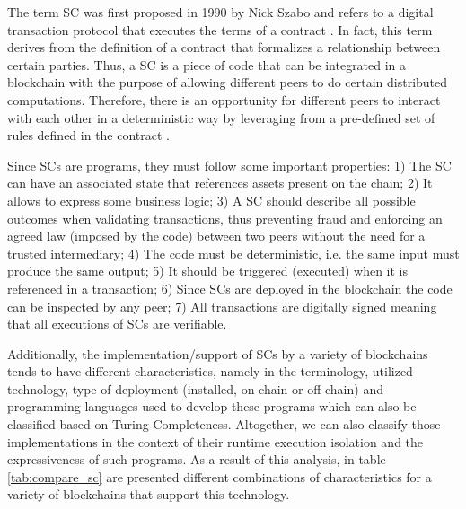 % 

The term \gls{SC} was first proposed in 1990 by Nick Szabo and refers to a digital transaction protocol that executes the terms of a contract \cite{smart_contract_nick_szabo}. In fact, this term derives from the definition of a contract that formalizes a relationship between certain parties. Thus, a \gls{SC} is a piece of code that can be integrated in a blockchain with the purpose of allowing different peers to do certain distributed computations. Therefore, there is an opportunity for different peers to interact with each other in a deterministic way by leveraging from a pre-defined set of rules defined in the contract \cite{blockchains_and_Smart_Contracts_IoT}.

Since \gls{SC}s are programs, they must follow some important properties:
1) The \gls{SC} can have an associated state that references assets present on the chain;
2) It allows to express some business logic;
3) A \gls{SC} should describe all possible outcomes when validating transactions, thus preventing fraud and enforcing an agreed law (imposed by the code) between two peers without the need for a trusted intermediary;
4) The code must be deterministic, i.e. the same input must produce the same output;
5) It should be triggered (executed) when it is referenced in a transaction;
6) Since \gls{SC}s are deployed in the blockchain the code can be inspected by any peer;
7) All transactions are digitally signed meaning that all executions of \gls{SC}s are verifiable.


Additionally, the implementation/support of \gls{SC}s by a variety of blockchains tends to have different characteristics, namely in the terminology, utilized technology, type of deployment (installed, on-chain or off-chain) and programming languages used to develop these programs which can also be classified based on Turing Completeness. Altogether, we can also classify those implementations in the context of their runtime execution isolation and the expressiveness of such programs. As a result of this analysis, in table \ref{tab:compare_sc} are presented different combinations of characteristics for a variety of blockchains that support this technology.

